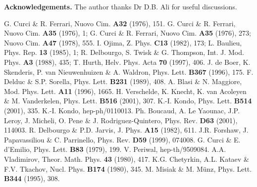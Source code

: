 \documentclass[a4paper,11pt]{article}
\begin{document}
\vspace{0.3cm} 
\noindent 
{\bf Acknowledgements.} The author thanks Dr D.B. Ali for useful discussions. 

\newpage 

\begin{thebibliography}{99} 
 G. Curci \& R. Ferrari, Nuovo Cim. {\bf A32} (1976), 151. 
 G. Curci \& R. Ferrari, Nuovo Cim. {\bf A35} (1976), 1; 
G. Curci \& R. Ferrari, Nuovo Cim. {\bf A35} (1976), 273; 
Nuovo Cim. {\bf A47} (1978), 555. 
 I. Ojima, Z. Phys. {\bf C13} (1982), 173; 
L. Baulieu, Phys. Rep. {\bf 13} (1985), 1; 
R. Delbourgo, S. Twisk \& G. Thompson, Int. J. Mod. Phys. {\bf A3} (1988), 435;
T. Hurth, Helv. Phys. Acta {\bf 70} (1997), 406. 
 J. de Boer, K. Skenderis, P. van Nieuwenhuizen \& A. Waldron, Phys.
Lett. {\bf B367} (1996), 175. 
 F. Delduc \& S.P. Sorella, Phys. Lett. {\bf B231} (1989), 408. 
 A. Blasi \& N. Maggiore, Mod. Phys. Lett. {\bf A11} (1996), 1665. 
 H. Verschelde, K. Knecht, K. van Acoleyen \& M. Vanderkelen, 
Phys. Lett. {\bf B516} (2001), 307. 
 K.-I. Kondo, Phys. Lett. {\bf B514} (2001), 335.  
 K.-I. Kondo, hep-ph/0110013. 
 Ph. Boucaud, A. Le Yaounac, J.P. Leroy, J. Micheli, O. Pene \&
J. Rodriguez-Quintero, Phys. Rev. {\bf D63} (2001), 114003. 
 R. Delbourgo \& P.D. Jarvis, J. Phys. {\bf A15} (1982), 611.
 J.R. Forshaw, J. Papavassiliou \& C. Parrinello, Phys. Rev. {\bf
D59} (1999), 074008. 
 G. Curci \& E. d'Emilio, Phys. Lett. {\bf B83} (1979), 199. 
 V. Periwal, hep-th/9509084. 
 A.A. Vladimirov, Theor. Math. Phys. {\bf 43} (1980), 417.
 K.G. Chetyrkin, A.L. Kataev \& F.V. Tkachov, Nucl. Phys. {\bf 
B174} (1980), 345.
 M. Misiak \& M. M\"{u}nz, Phys. Lett. {\bf B344} (1995), 308.

\end{thebibliography}
\end{document}
